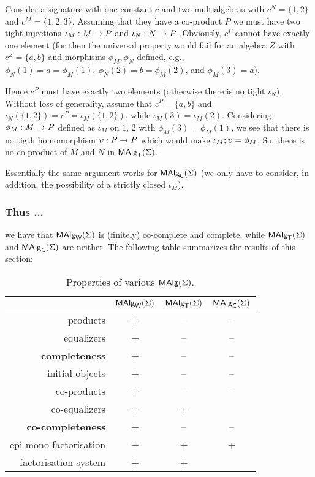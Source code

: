 \documentclass[10pt]{article}
\begin{document}
\begin{Proof}
Consider a signature with one constant $c$ and two multialgebras with
$c^N=\{1,2\}$ and $c^M=\{1,2,3\}$. Assuming that they have a
co-product $P$ we must have two tight injections $\iota_M:M\rightarrow P$
and $\iota_N:N\rightarrow P$. Obviously, $c^P$ cannot have exactly one
element (for then the universal property would fail for an algebra $Z$
with $c^Z=\{a,b\}$ and morphisms $\phi_M,\phi_N$ defined, e.g.,
$\phi_N(1)=a=\phi_M(1),\ \phi_N(2)=b=\phi_M(2)$, and $\phi_M(3)=a$).

Hence $c^P$ must have exactly two elements (otherwise there is no
tight $\iota_N$).  Without loss of generality, assume that
$c^P=\{a,b\}$ and $\iota_N(\{1,2\})=c^P=\iota_M(\{1,2\})$, while
$\iota_M(3)=\iota_M(2)$.  Considering $\phi_M:M\rightarrow P$ defined as
$\iota_M$ on $1$, $2$ with $\phi_M(3)=\phi_M(1)$, we see that there is
no tigth homomorphism $\upsilon:P\rightarrow P$ which would make
$\iota_M;\upsilon=\phi_M$. So, there is no co-product of $M$ and $N$
in $\mbox{\rm\sf MAlg}_{\sf T}(\Sigma)$.

Essentially the same argument works for $\mbox{\rm\sf MAlg}_{\sf C}(\Sigma)$ (we only have to
consider, in addition, the possibility of a strictly closed
$\iota_M$).
\end{Proof}

\subsubsection*{Thus ...} 

we have that $\mbox{\rm\sf MAlg}_{\sf W}(\Sigma)$ is (finitely) co-complete and complete, 
while $\mbox{\rm\sf MAlg}_{\sf T}(\Sigma)$ and $\mbox{\rm\sf MAlg}_{\sf C}(\Sigma)$ are neither.
The following table summarizes the results of this section:

\begin{table}[htb]
\begin{center}
\begin{tabular}{|r|c|c|c|}
\hline 
                   & $\mbox{\rm\sf MAlg}_{\sf W}(\Sigma)$ & $\mbox{\rm\sf MAlg}_{\sf T}(\Sigma)$ & $\mbox{\rm\sf MAlg}_{\sf C}(\Sigma)$ \\ \hline
products           & +  & -- & -- \\
equalizers         & +  & -- & -- \\
{\bf completeness} & +  & -- & --  \\ \hline
initial objects    & +  & -- & -- \\
co-products        & +  & --  &  -- \\
co-equalizers      & +  & +  &  \\
{\bf co-completeness} & +  & -- & -- \\ \hline
epi-mono factorisation & +  & +  & + \\ 
factorisation system & +  & +  &  \\ \hline %
\end{tabular}
\end{center}
\caption{Properties of various $\mbox{\rm\sf MAlg}(\Sigma)$.}\label{tab:A} \vspace*{-3ex}
\end{table}
\end{document}
